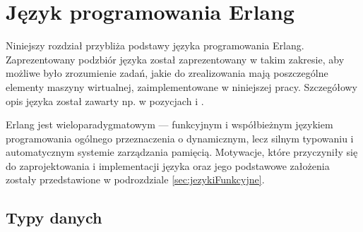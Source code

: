 \chapter{Język programowania Erlang}
\label{cha:erlang}

Niniejszy rozdział przybliża podstawy języka programowania Erlang.
Zaprezentowany podzbiór języka został zaprezentowany w takim zakresie, aby możliwe było zrozumienie zadań, jakie do zrealizowania mają poszczególne elementy maszyny wirtualnej, zaimplementowane w niniejszej pracy.
Szczegółowy opis języka został zawarty np. w pozycjach \cite{Armstrong2013} i \cite{Hebert2013}.


Erlang jest wieloparadygmatowym --- funkcyjnym i współbieżnym językiem programowania ogólnego przeznaczenia o dynamicznym, lecz silnym typowaniu i automatycznym systemie zarządzania pamięcią.
Motywacje, które przyczyniły się do zaprojektowania i implementacji języka oraz jego podstawowe założenia zostały przedstawione w podrozdziale \ref{sec:jezykiFunkcyjne}.

\section{Typy danych}
\label{sec:erlangTypy}

